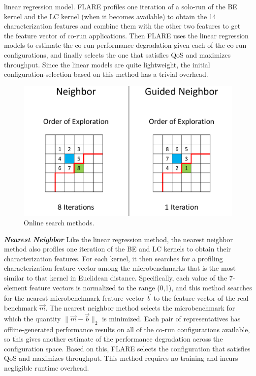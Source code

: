 linear regression model. %
 FLARE profiles 
one iteration of a solo-run of the BE kernel and the LC kernel (when it becomes available) to obtain the 14
characterization features and combine them with the other two features to get the feature vector of co-run applications. Then FLARE uses the linear regression models to
estimate the co-run performance degradation given each of the co-run
configurations, and finally selects the one that satisfies QoS and maximizes throughput.
Since the linear models are quite lightweight, the initial configuration-selection based on this method has a trivial overhead.\\
\begin{figure}
			\centering
			\includegraphics[width=\linewidth]{figures/new_search.pdf}
			\caption{Online search methods.}
			\label{fig:search}
			\vspace{-.3in}
			\end{figure}
		\textbf{\textit{Nearest Neighbor}} Like the linear regression method, the nearest neighbor method also profiles 
        one iteration of the BE and LC kernels to obtain their characterization features. For each kernel, 
        it then searches for a profiling characterization feature vector among the microbenchmarks that is the most similar 
        to that kernel in Euclidean distance. Specifically, each value of the 7-element feature vectors is normalized 
        to the range (0,1), and this method searches for the nearest microbenchmark feature vector $\vec{b}$ to the 
        feature vector of the real benchmark $\vec{m}$. 
        The nearest neighbor method selects the microbenchmark for which the quantity $\| \vec{m} - \vec{b} \|_2$ is minimized. 
        Each pair of representatives has offline-generated performance results on all of the co-run configurations available, 
        so this gives another estimate of the performance degradation across the configuration space. 
        Based on this, FLARE selects the configuration that satisfies QoS and maximizes throughput. This method requires no training and incurs negligible runtime overhead.
